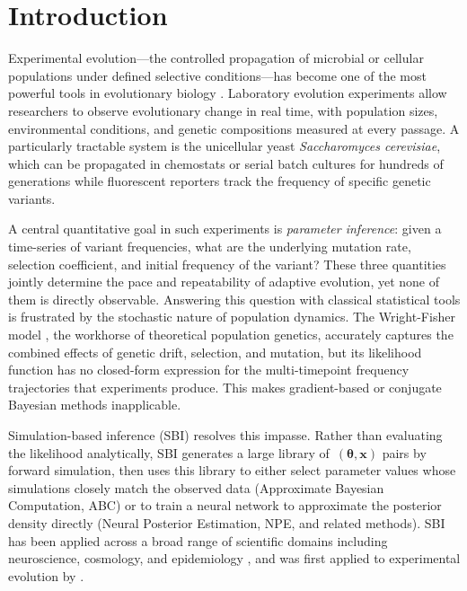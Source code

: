 \documentclass[11pt]{article}
\newcommand{\btheta}{\boldsymbol{\theta}}
\newcommand{\bx}{\mathbf{x}}
\begin{document}
\section{Introduction}
\label{sec:intro}

Experimental evolution---the controlled propagation of microbial or cellular
populations under defined selective conditions---has become one of the most
powerful tools in evolutionary biology
\citep{lenski2017experimental,barrick2013genome}.
Laboratory evolution experiments allow researchers to observe evolutionary
change in real time, with population sizes, environmental conditions, and
genetic compositions measured at every passage.
A particularly tractable system is the unicellular yeast \emph{Saccharomyces
cerevisiae}, which can be propagated in chemostats or serial batch cultures
for hundreds of generations while fluorescent reporters track the frequency of
specific genetic variants.

A central quantitative goal in such experiments is \emph{parameter
inference}: given a time-series of variant frequencies, what are the
underlying mutation rate, selection coefficient, and initial frequency of the
variant?
These three quantities jointly determine the pace and repeatability of
adaptive evolution, yet none of them is directly observable.
Answering this question with classical statistical tools is frustrated by the
stochastic nature of population dynamics.
The Wright-Fisher model \citep{ewens2004mathematical}, the workhorse of
theoretical population genetics, accurately captures the combined effects of
genetic drift, selection, and mutation, but its likelihood function has no
closed-form expression for the multi-timepoint frequency trajectories that
experiments produce.
This makes gradient-based or conjugate Bayesian methods inapplicable.

Simulation-based inference (SBI) \citep{cranmer2020frontier} resolves this
impasse.
Rather than evaluating the likelihood analytically, SBI generates a large
library of~$({\btheta}, \bx)$ pairs by forward simulation, then uses this
library to either select parameter values whose simulations closely match the
observed data (Approximate Bayesian Computation, ABC) or to train a neural
network to approximate the posterior density directly (Neural Posterior
Estimation, NPE, and related methods).
SBI has been applied across a broad range of scientific domains including
neuroscience, cosmology, and epidemiology
\citep{cranmer2020frontier,lueckmann2021benchmarking}, and was first applied
to experimental evolution by \citet{avecilla2022neural}.
\end{document}
